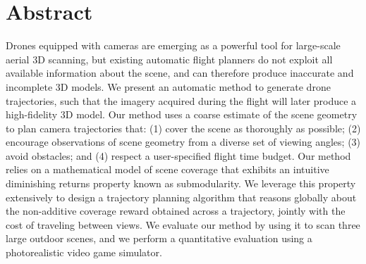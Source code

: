 \section{Abstract}


Drones equipped with cameras are emerging as a powerful tool for large-scale aerial 3D scanning, 
but existing automatic flight planners do not exploit all available information about the scene, and can therefore produce inaccurate and incomplete 3D models. 
We present an automatic method to generate drone trajectories, such that the imagery acquired during the flight will later produce a high-fidelity 3D model. Our method uses a coarse estimate of the scene geometry to plan camera trajectories that: (1) cover the scene as thoroughly as possible; (2) encourage observations of scene geometry from a diverse set of viewing angles; (3) avoid obstacles; and (4) respect a user-specified flight time
budget. Our method relies on a mathematical model of scene coverage that exhibits an intuitive diminishing returns property known as submodularity.
We leverage this property extensively to design a trajectory planning algorithm  that reasons globally about the non-additive coverage reward obtained across a trajectory, jointly with the cost of traveling between views.
We evaluate our method by using it to scan three large outdoor scenes, and we perform a quantitative evaluation using a photorealistic video game simulator.
